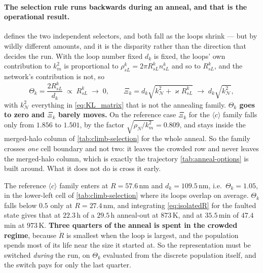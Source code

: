 \documentclass{article}
\newcommand{\cloop}{\ensuremath{\langle c\rangle}}
\begin{document}
\paragraph{The selection rule runs backwards during an anneal, and that is the
operational result.}  defines the two independent selectors,
and both fall as the loops shrink --- but by wildly different amounts, and it is
the disparity rather than the direction that decides the run. With the loop
number fixed $d_k$ is fixed, the loops' own contribution to $k^2_m$ is
proportional to $\rho^k_{sL}=2\pi R^k_{sL}n^k_{sL}$ and so to $R^k_{sL}$, and the
network's contribution is not, so
\begin{equation}
  \Theta_k=\frac{2R^k_{sL}}{d_k}\;\propto\;R^k_{sL}\;\longrightarrow\;0,
  \qquad
  \Xi_k=d_k\sqrt{k^2_{\mathcal N}+\varkappa R^k_{sL}}
   \;\longrightarrow\;d_k\sqrt{k^2_{\mathcal N}} ,
  \label{eq:annealselectors}
\end{equation}
with $k^2_{\mathcal N}$ everything in \cref{eq:KL_matrix} that is not the
annealing family. \textbf{$\Theta_k$ goes to zero and $\Xi_k$ barely moves.} On
the reference case $\Xi_k$ for the \cloop{} family falls only from $1.856$ to
$1.501$, by the factor $\sqrt{\rho_N/k^2_m}=0.809$, and stays inside the
merged-halo column of \cref{tab:climb-selection} for the whole anneal. So the
family crosses \emph{one} cell boundary and not two: it leaves the crowded row
and never leaves the merged-halo column, which is exactly the trajectory
\cref{tab:anneal-options} is built around. What it does not do is cross it
early.

The reference \cloop{} family enters at $R=57.6\,$nm and $d_k=109.5\,$nm, i.e.\
$\Theta_k=1.05$, in the lower-left cell of \cref{tab:climb-selection} where its
loops overlap on average. $\Theta_k$ falls below $0.5$ only at $R=27.4\,$nm, and
integrating \cref{eq:isolatedR} for the faulted state gives that at $22.3\,$h of
a $29.5\,$h anneal-out at $873\,$K, and at $35.5\,$min of $47.4\,$min at
$973\,$K. \textbf{Three quarters of the anneal is spent in the crowded regime},
because $\dot R$ is smallest when the loop is largest, and the population spends
most of its life near the size it started at. So the representation must be
switched \emph{during} the run, on $\Theta_k$ evaluated from the discrete
population itself, and the switch pays for only the last quarter.
\end{document}
